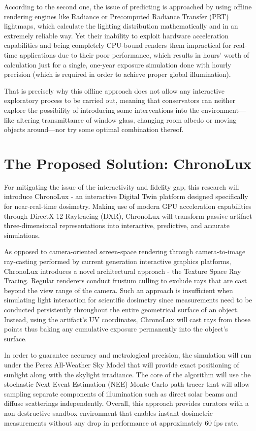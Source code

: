 According to the second one, the issue of predicting is approached by using offline rendering engines like Radiance or Precomputed Radiance Transfer (PRT) lightmaps, which calculate the lighting distribution mathematically and in an extremely reliable way. Yet their inability to exploit hardware acceleration capabilities and being completely CPU-bound renders them impractical for real-time applications due to their poor performance, which results in hours' worth of calculation just for a single, one-year exposure simulation done with hourly precision (which is required in order to achieve proper global illumination).

That is precisely why this offline approach does not allow any interactive exploratory process to be carried out, meaning that conservators can neither explore the possibility of introducing some interventions into the environment—like altering transmittance of window glass, changing room albedo or moving objects around—nor try some optimal combination thereof.

\section{The Proposed Solution: ChronoLux}
For mitigating the issue of the interactivity and fidelity gap, this research will introduce ChronoLux - an interactive Digital Twin platform designed specifically for near-real-time dosimetry. Making use of modern GPU acceleration capabilities through DirectX 12 Raytracing (DXR), ChronoLux will transform passive artifact three-dimensional representations into interactive, predictive, and accurate simulations.

As opposed to camera-oriented screen-space rendering through camera-to-image ray-casting performed by current generation interactive graphics platforms, ChronoLux introduces a novel architectural approach - the Texture Space Ray Tracing. Regular renderers conduct frustum culling to exclude rays that are cast beyond the view range of the camera. Such an approach is insufficient when simulating light interaction for scientific dosimetry since measurements need to be conducted persistently throughout the entire geometrical surface of an object. Instead, using the artifact's UV coordinates, ChronoLux will cast rays from those points thus baking any cumulative exposure permanently into the object's surface.

In order to guarantee accuracy and metrological precision, the simulation will run under the Perez All-Weather Sky Model that will provide exact positioning of sunlight along with the skylight irradiance. The core of the algorithm will use the stochastic Next Event Estimation (NEE) Monte Carlo path tracer that will allow sampling separate components of illumination such as direct solar beams and diffuse scatterings independently. Overall, this approach provides curators with a non-destructive sandbox environment that enables instant dosimetric measurements without any drop in performance at approximately 60 fps rate.


